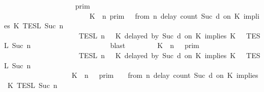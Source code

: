 \begin{isabellebody}
\ \ \ \ \ \ \ \ \ \ \ \ \ \ \ \ \ {\isasymunion}\ {\isacharparenleft}{\isasymlbrakk}{\isasymlbrakk}\ {\isasymGamma}\ {\isasymrbrakk}{\isasymrbrakk}\isactrlsub p\isactrlsub r\isactrlsub i\isactrlsub m\isanewline
\ \ \ \ \ \ \ \ \ \ \ \ \ \ \ \ \ \ \ \ \ \ {\isasyminter}\ {\isacharparenleft}{\isasymlbrakk}\ K\ {\isasymUp}\ n\ {\isasymrbrakk}\isactrlsub p\isactrlsub r\isactrlsub i\isactrlsub m\ {\isasyminter}\ {\isasymlbrakk}\ from\ n\ delay\ count\ {\isacharparenleft}Suc\ d{\isacharparenright}\ on\ K\ implies\ K\ {\isasymrbrakk}\isactrlsub T\isactrlsub E\isactrlsub S\isactrlsub L\isactrlbsup {\isasymge}\ Suc\ n\isactrlesup {\isacharparenright}\isanewline
\ \ \ \ \ \ \ \ \ \ \ \ \ \ \ \ \ \ {\isasyminter}\ {\isasymlbrakk}{\isasymlbrakk}\ {\isasymPsi}\ {\isasymrbrakk}{\isasymrbrakk}\isactrlsub T\isactrlsub E\isactrlsub S\isactrlsub L\isactrlbsup {\isasymge}\ n\isactrlesup \ {\isasyminter}\ {\isasymlbrakk}{\isasymlbrakk}\ {\isacharparenleft}K\ delayed\ by\ {\isacharparenleft}Suc\ d{\isacharparenright}\ on\ K\ implies\ K\ {\isacharhash}\ {\isasymPhi}\ {\isasymrbrakk}{\isasymrbrakk}\isactrlsub T\isactrlsub E\isactrlsub S\isactrlsub L\isactrlbsup {\isasymge}\ Suc\ n\isactrlesup \isanewline
\ \ \ \ \ \ \ \ \ \ \ \ \ \ \ \ \ \ \ {\isacharparenright}{\isacartoucheclose}\ \isamarkupfalse%
\ blast\isanewline
\ \ \isamarkupfalse%
\ \isamarkupfalse%
\ {\isacartoucheopen}{\isachardot}{\isachardot}{\isachardot}\ {\isacharequal}\ {\isacharparenleft}{\isasymlbrakk}{\isasymlbrakk}\ {\isacharparenleft}K\ {\isasymnot}{\isasymUp}\ n{\isacharparenright}\ {\isacharhash}\ {\isasymGamma}\ {\isasymrbrakk}{\isasymrbrakk}\isactrlsub p\isactrlsub r\isactrlsub i\isactrlsub m\ \isanewline
\ \ \ \ \ \ \ \ \ \ \ \ \ \ \ \ \ \ {\isasyminter}\ {\isasymlbrakk}{\isasymlbrakk}\ {\isasymPsi}\ {\isasymrbrakk}{\isasymrbrakk}\isactrlsub T\isactrlsub E\isactrlsub S\isactrlsub L\isactrlbsup {\isasymge}\ n\isactrlesup \ {\isasyminter}\ {\isasymlbrakk}{\isasymlbrakk}\ {\isacharparenleft}K\ delayed\ by\ {\isacharparenleft}Suc\ d{\isacharparenright}\ on\ K\ implies\ K\ {\isacharhash}\ {\isasymPhi}\ {\isasymrbrakk}{\isasymrbrakk}\isactrlsub T\isactrlsub E\isactrlsub S\isactrlsub L\isactrlbsup {\isasymge}\ Suc\ n\isactrlesup {\isacharparenright}\isanewline
\ \ \ \ \ \ \ \ \ \ \ \ \ \ \ \ \ {\isasymunion}\ {\isacharparenleft}{\isasymlbrakk}{\isasymlbrakk}\ {\isacharparenleft}K\ {\isasymUp}\ n{\isacharparenright}\ {\isacharhash}\ {\isasymGamma}\ {\isasymrbrakk}{\isasymrbrakk}\isactrlsub p\isactrlsub r\isactrlsub i\isactrlsub m\ \ {\isasyminter}\ {\isasymlbrakk}\ from\ n\ delay\ count\ {\isacharparenleft}Suc\ d{\isacharparenright}\ on\ K\ implies\ K\ {\isasymrbrakk}\isactrlsub T\isactrlsub E\isactrlsub S\isactrlsub L\isactrlbsup {\isasymge}\ Suc\ n\isactrlesup \isanewline

\end{isabellebody}
